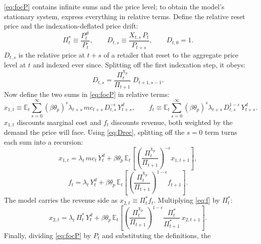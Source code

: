 \documentclass[11pt]{article}
\begin{document}
\eqref{eq:focP} contains infinite sums and the price level; to obtain the model's
stationary system, express everything in relative terms. Define the relative reset
price and the indexation-deflated price drift:
\begin{equation}\label{eq:defs}
    \Pi_t^{*} \equiv \frac{P_t^{\#}}{P_t}, \qquad
    D_{t,s} \equiv \frac{X_{t,s}\,P_t}{P_{t+s}}, \qquad D_{t,0} = 1.
\end{equation}
$D_{t,s}$ is the relative price at $t+s$ of a retailer that reset to the aggregate
price level at $t$ and indexed ever since. Splitting off the first indexation step,
it obeys:
\begin{equation}\label{eq:Drec}
    D_{t,s} = \frac{\Pi_t^{\chi_p}}{\Pi_{t+1}}\; D_{t+1,s-1}.
\end{equation}
Now define the two sums in \eqref{eq:focP} in relative terms:
\begin{equation}\label{eq:x1def}
    x_{1,t} \equiv \mathbb{E}_t \sum_{s=0}^{\infty}
    \left(\beta\theta_p\right)^{s} \lambda_{t+s}\, mc_{t+s}\, D_{t,s}^{-\epsilon}\,
    Y_{t+s}^{d}, \qquad
    f_{t} \equiv \mathbb{E}_t \sum_{s=0}^{\infty}
    \left(\beta\theta_p\right)^{s} \lambda_{t+s}\, D_{t,s}^{1-\epsilon}\,
    Y_{t+s}^{d}.
\end{equation}
$x_{1,t}$ discounts marginal cost and $f_t$ discounts revenue, both weighted by the
demand the price will face. Using \eqref{eq:Drec}, splitting off the $s=0$ term
turns each sum into a recursion:
\begin{equation}\label{eq:x1}
    x_{1,t} = \lambda_t\, mc_t\, Y_t^{d}
    + \beta\theta_p\, \mathbb{E}_t\!\left[
    \left(\frac{\Pi_t^{\chi_p}}{\Pi_{t+1}}\right)^{-\epsilon} x_{1,t+1}\right],
\end{equation}
\begin{equation}\label{eq:f}
    f_{t} = \lambda_t\, Y_t^{d}
    + \beta\theta_p\, \mathbb{E}_t\!\left[
    \left(\frac{\Pi_t^{\chi_p}}{\Pi_{t+1}}\right)^{1-\epsilon} f_{t+1}\right].
\end{equation}
The model carries the revenue side as $x_{2,t} \equiv \Pi_t^{*} f_t$. Multiplying
\eqref{eq:f} by $\Pi_t^{*}$:
\begin{equation}\label{eq:x2}
    x_{2,t} = \lambda_t\, \Pi_t^{*}\, Y_t^{d}
    + \beta\theta_p\, \mathbb{E}_t\!\left[
    \left(\frac{\Pi_t^{\chi_p}}{\Pi_{t+1}}\right)^{1-\epsilon}
    \frac{\Pi_t^{*}}{\Pi_{t+1}^{*}}\, x_{2,t+1}\right].
\end{equation}
Finally, dividing \eqref{eq:focP} by $P_t$ and substituting the definitions, the
\end{document}
